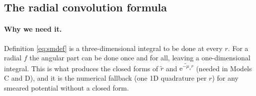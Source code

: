 \documentclass[11pt,a4paper]{article}
\numberwithin{equation}{section}
\theoremstyle{definition}
\theoremstyle{plain}
\theoremstyle{remark}
\numberwithin{algorithm}{section}
\newcommand{\ee}{\mathrm{e}}
\newcommand{\mus}{\mu_s}
\begin{document}
\subsection{The radial convolution formula}\label{sec:radconv}
\paragraph{Why we need it.} Definition \eqref{eq:smdef} is a three-dimensional integral to be done at every $r$. For a radial $f$ the angular part can be done once and for all, leaving a one-dimensional integral. This is what produces the closed forms of $\tilde r$ and $\widetilde{\ee^{-\mus r}}$ (needed in Models C and D), and it is the numerical fallback (one 1D quadrature per $r$) for any smeared potential without a closed form.
\end{document}
